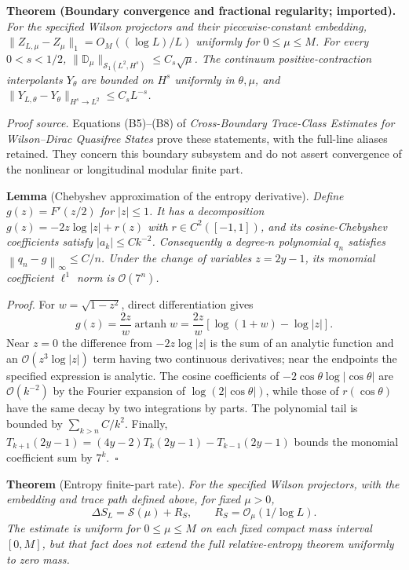 \documentclass[
  10pt,
  a4paper,
]{article}
\begin{document}
\textbf{Theorem (Boundary convergence and fractional regularity; imported).} \emph{For the specified Wilson projectors and their piecewise-constant embedding, \(\|Z_{L,\mu}-Z_\mu\|_1=O_M((\log L)/L)\) uniformly for \(0\le\mu\le M\). For every \(0<s<1/2\), \(\|\mathbb D_\mu\|_{\mathcal S_1(L^2,H^s)}\le C_s\sqrt\mu\). The continuum positive-contraction interpolants \(Y_\theta\) are bounded on \(H^s\) uniformly in \(\theta,\mu\), and \(\|Y_{L,\theta}-Y_\theta\|_{H^s\to L^2}\le C_sL^{-s}\).}

\emph{Proof source.} Equations (B5)--(B8) of \emph{Cross-Boundary Trace-Class Estimates for Wilson--Dirac Quasifree States} prove these statements, with the full-line aliases retained. They concern this boundary subsystem and do not assert convergence of the nonlinear or longitudinal modular finite part.

\label{lem:cheb}
\textbf{Lemma} (Chebyshev approximation of the entropy derivative). \emph{Define \(g(z)=F'(z/2)\) for \(|z|\le1\). It has a decomposition \(g(z)=-2z\log|z|+r(z)\) with \(r\in C^2([-1,1])\), and its cosine-Chebyshev coefficients satisfy \(|a_k|\le Ck^{-2}\). Consequently a degree-\(n\) polynomial \(q_n\) satisfies \(\left\lVert q_n-g\right\rVert_\infty\le C/n\). Under the change of variables \(z=2y-1\), its monomial coefficient \(\ell^1\) norm is \(\mathcal O(7^n)\).}

\emph{Proof.} For \(w=\sqrt{1-z^2}\), direct differentiation gives \[g(z)=\frac{2z}{w}\operatorname{artanh}w=\frac{2z}{w}[\log(1+w)-\log|z|].\] Near \(z=0\) the difference from \(-2z\log|z|\) is the sum of an analytic function and an \(\mathcal O(z^3\log|z|)\) term having two continuous derivatives; near the endpoints the specified expression is analytic. The cosine coefficients of \(-2\cos\theta\log|\cos\theta|\) are \(\mathcal O(k^{-2})\) by the Fourier expansion of \(\log(2|\cos\theta|)\), while those of \(r(\cos\theta)\) have the same decay by two integrations by parts. The polynomial tail is bounded by \(\sum_{k>n}C/k^2\). Finally, \(T_{k+1}(2y-1)=(4y-2)T_k(2y-1)-T_{k-1}(2y-1)\) bounds the monomial coefficient sum by \(7^k\).~\(\square\)

\label{thm:entropy}
\textbf{Theorem} (Entropy finite-part rate). \emph{For the specified Wilson projectors, with the embedding and trace path defined above, for fixed \(\mu>0\), \begin{equation}
\label{eq:entropy}
\Delta S_L=\mathcal S(\mu)+R_S,
\qquad R_S=\mathcal O_\mu(1/\log L).
\end{equation} The estimate is uniform for \(0\le\mu\le M\) on each fixed compact mass interval \([0,M]\), but that fact does not extend the full relative-entropy theorem uniformly to zero mass.}
\end{document}
